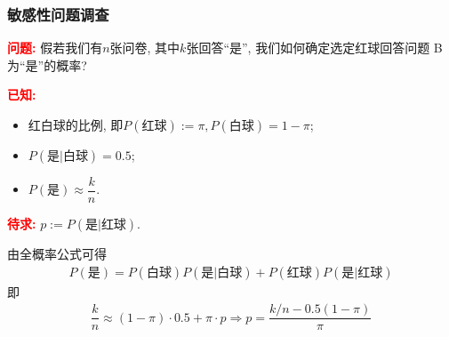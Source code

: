 \begin{frame}
	\frametitle{敏感性问题调查}
	{\bf \textcolor{red}{问题:}} 假若我们有$n$张问卷, 其中$k$张回答“是”, 我们如何确定选定红球回答问题 B 为“是”的概率?


	\pause
	{\bf \textcolor{red}{已知:}}
	\begin{itemize}[<+-|alert@+>]
		\item 红白球的比例, 即$P(\mbox{红球}):=\pi, P(\mbox{白球})=1-\pi$;
		\item $P(\mbox{是}|\mbox{白球})=0.5$;
		\item $P(\mbox{是})\approx \dfrac{k}{n}$.
	\end{itemize}
	\pause
	{\bf \textcolor{red}{待求:}} $p:=P(\mbox{是}|\mbox{红球})$.

	\pause
	{\bf\jieda} 由全概率公式可得
	\begin{eqnarray*}
		P(\mbox{是})=P(\mbox{白球})P(\mbox{是}|\mbox{白球})+P(\mbox{红球})P(\mbox{是}|\mbox{红球})
	\end{eqnarray*}
	即\pause
	\begin{eqnarray*}
		\dfrac{k}{n}\approx (1-\pi)\cdot 0.5+\pi\cdot p \Rightarrow p=\dfrac{k/n-0.5(1-\pi)}{\pi}
	\end{eqnarray*}


\end{frame}




